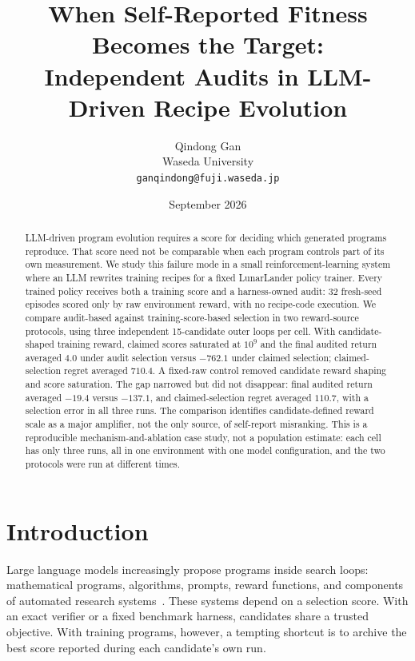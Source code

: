 \documentclass[11pt]{article}
\title{When Self-Reported Fitness Becomes the Target:\\
Independent Audits in LLM-Driven Recipe Evolution}
\author{Qindong Gan\\
Waseda University\\
\texttt{ganqindong@fuji.waseda.jp}}
\date{September 2026}
\begin{document}
\maketitle

\begin{abstract}
LLM-driven program evolution requires a score for deciding which generated programs reproduce.
That score need not be comparable when each program controls part of its own measurement. We
study this failure mode in a small reinforcement-learning system where an LLM rewrites training
recipes for a fixed LunarLander policy trainer. Every trained policy receives both a training
score and a harness-owned audit: 32 fresh-seed episodes scored only by raw environment reward,
with no recipe-code execution. We compare audit-based against training-score-based selection in
two reward-source protocols, using three independent 15-candidate outer loops per cell. With
candidate-shaped training reward, claimed scores saturated at $10^9$ and the final audited return
averaged $4.0$ under audit selection versus $-762.1$ under claimed selection; claimed-selection
regret averaged $710.4$. A fixed-raw control removed candidate reward shaping and score
saturation. The gap narrowed but did not disappear: final audited return averaged $-19.4$ versus
$-137.1$, and claimed-selection regret averaged $110.7$, with a selection error in all three
runs. The comparison identifies candidate-defined reward scale as a major amplifier, not the only
source, of self-report misranking. This is a reproducible mechanism-and-ablation case study, not
a population estimate: each cell has only three runs, all in one environment with one model
configuration, and the two protocols were run at different times.
\end{abstract}

\section{Introduction}

Large language models increasingly propose programs inside search loops: mathematical programs,
algorithms, prompts, reward functions, and components of automated research
systems~\citep{romeraparedes2024funsearch,novikov2025alphaevolve,real2020automlzero,
yang2024opro,ma2024eureka,lu2024aiscientist}. These systems depend on a selection score. With an
exact verifier or a fixed benchmark harness, candidates share a trusted objective. With training
programs, however, a tempting shortcut is to archive the best score reported during each
candidate's own run.
\end{document}
